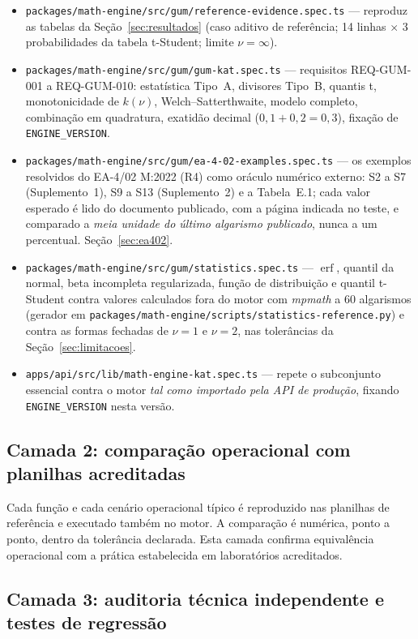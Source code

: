\documentclass[11pt,a4paper]{article}
\begin{document}
\begin{itemize}
  \item \texttt{packages/math-engine/src/gum/reference-evidence.spec.ts} --- reproduz as tabelas da Seção~\ref{sec:resultados} (caso aditivo de referência; 14 linhas \(\times\) 3 probabilidades da tabela t-Student; limite \(\nu = \infty\)).
  \item \texttt{packages/math-engine/src/gum/gum-kat.spec.ts} --- requisitos REQ-GUM-001 a REQ-GUM-010: estatística Tipo~A, divisores Tipo~B, quantis t, monotonicidade de \(k(\nu)\), Welch--Satterthwaite, modelo completo, combinação em quadratura, exatidão decimal (\(0{,}1 + 0{,}2 = 0{,}3\)), fixação de \texttt{ENGINE\_VERSION}.
  \item \texttt{packages/math-engine/src/gum/ea-4-02-examples.spec.ts} --- os exemplos resolvidos do EA-4/02 M:2022 (R4) como oráculo numérico externo: S2 a S7 (Suplemento~1), S9 a S13 (Suplemento~2) e a Tabela~E.1; cada valor esperado é lido do documento publicado, com a página indicada no teste, e comparado a \emph{meia unidade do último algarismo publicado}, nunca a um percentual. Seção~\ref{sec:ea402}.
  \item \texttt{packages/math-engine/src/gum/statistics.spec.ts} --- \(\operatorname{erf}\), quantil da normal, beta incompleta regularizada, função de distribuição e quantil t-Student contra valores calculados fora do motor com \emph{mpmath} a 60 algarismos (gerador em \texttt{packages/math-engine/scripts/statistics-reference.py}) e contra as formas fechadas de \(\nu = 1\) e \(\nu = 2\), nas tolerâncias da Seção~\ref{sec:limitacoes}.
  \item \texttt{apps/api/src/lib/math-engine-kat.spec.ts} --- repete o subconjunto essencial contra o motor \emph{tal como importado pela API de produção}, fixando \texttt{ENGINE\_VERSION} nesta versão.
\end{itemize}

\subsection{Camada 2: comparação operacional com planilhas acreditadas}

Cada função e cada cenário operacional típico é reproduzido nas planilhas de referência e executado também no motor. A comparação é numérica, ponto a ponto, dentro da tolerância declarada. Esta camada confirma equivalência operacional com a prática estabelecida em laboratórios acreditados.

\subsection{Camada 3: auditoria técnica independente e testes de regressão}
\end{document}
